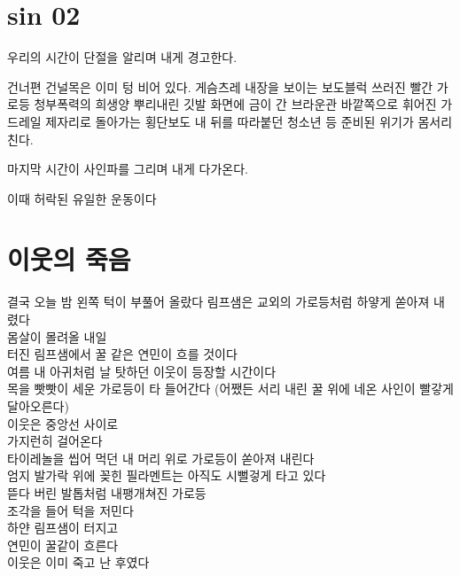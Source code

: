 \documentclass[12pt, b6paper, openany]{memoir}
\newenvironment{lyric}{%
	\setlength{\parindent}{0pt}
}{}
\begin{document}
\begin{lyric}
\hypertarget{sin-02}{%

\chapter{sin 02}\label{sin-02}}



우리의 시간이 단절을 알리며 내게 경고한다.



건너편 건널목은 이미 텅 비어 있다. 게슴츠레 내장을 보이는 보도블럭 쓰러진 빨간 가로등 청부폭력의 희생양 뿌리내린 깃발 화면에 금이 간 브라운관 바깥쪽으로 휘어진 가드레일 제자리로 돌아가는 횡단보도 내 뒤를 따라붙던 청소년 등 준비된 위기가 몸서리친다.



마지막 시간이 사인파를 그리며 내게 다가온다.



이때 허락된 유일한 운동이다


\end{lyric}
\begin{lyric}
\hypertarget{uxc774uxc6c3uxc758-uxc8fduxc74c}{%

\chapter{이웃의 죽음}\label{uxc774uxc6c3uxc758-uxc8fduxc74c}}



결국 오늘 밤 왼쪽 턱이 부풀어 올랐다 림프샘은 교외의 가로등처럼 하얗게 쏟아져 내렸다\\

몸살이 몰려올 내일\\

터진 림프샘에서 꿀 같은 연민이 흐를 것이다\\

여름 내 아귀처럼 날 탓하던 이웃이 등장할 시간이다\\

목을 빳빳이 세운 가로등이 타 들어간다 (어쨌든 서리 내린 꿀 위에 네온 사인이 빨갛게 달아오른다)\\

이웃은 중앙선 사이로\\

가지런히 걸어온다\\

타이레놀을 씹어 먹던 내 머리 위로 가로등이 쏟아져 내린다\\

엄지 발가락 위에 꽂힌 필라멘트는 아직도 시뻘겋게 타고 있다\\

뜯다 버린 발톱처럼 내팽개쳐진 가로등\\

조각을 들어 턱을 저민다\\

하얀 림프샘이 터지고\\

연민이 꿀같이 흐른다\\

이웃은 이미 죽고 난 후였다


\end{lyric}
\end{document}
